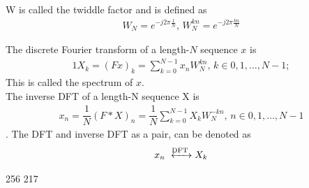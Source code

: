 W is called the twiddle factor and is defined as 
\begin{align*}
	W_N = e^{-j 2 \pi\frac{1}{N}}, \, W_N^{kn} = e^{-j 2 \pi\frac{kn}{N}}
\end{align*}

\begin{definition}
The discrete Fourier transform of a length-$N$ sequence $x$ is 
\begin{align*}1
	X_k = (Fx)_k = \sum_{k=0}^{N-1} x_n W_N^{kn}, \, k\in {0, 1, \dots, N-1};
\end{align*}
This is called the spectrum of $x$.\\
The inverse DFT of a length-N sequence X is
\begin{align*}
	x_n = \dfrac{1}{N}(F*X)_n = \dfrac{1}{N}\sum_{k=0}^{N-1} X_k W_N^{-kn}, \, n \in {0, 1, \dots, N-1}
\end{align*}
.
The DFT and inverse DFT as a pair, can be denoted as 
\begin{align*}
	x_n \xleftrightarrow{\text{DFT}} X_k
\end{align*}
\end{definition} 
\cite{FSP}



256 217

